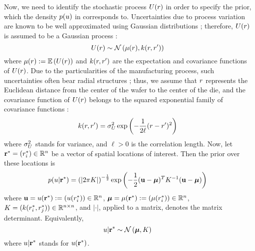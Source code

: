 Now, we need to identify the stochastic process $U(r)$ in order to specify the prior, which the density $\f{\u}$ in  corresponds to. Uncertainties due to process variation are known to be well approximated using Gaussian distributions \cite{srivastava2010}; therefore, $U(r)$ is assumed to be a Gaussian process \cite{rasmussen2006}:
\[
  \U(\r) \sim \gaussianp{\fMean{\r}}{\fCov{\r, \r'}}
\]
where $\fMean{\r} := \E{\U(\r)}$ and $\fCov{\r, \r'}$ are the expectation and covariance functions of $U(r)$. Due to the particularities of the manufacturing process, such uncertainties often bear radial structures \cite{cheng2011}; thus, we assume that $r$ represents the Euclidean distance from the center of the wafer to the center of the die, and the covariance function of $U(r)$ belongs to the squared exponential family of covariance functions \cite{rasmussen2006}:
\begin{equation} \elabel{covariance-function}
  \fCov{\r, \r'} = \sigma^2_\U \exp\left(-\frac{1}{2 \ell}(\r - \r')^2\right)
\end{equation}
where $\sigma^2_U$ stands for variance, and $\ell > 0$ is the correlation length. Now, let $\mathbf{r}^* = (r^*_i) \in \mathbb{R}^n$ be a vector of spatial locations of interest. Then the prior over these locations is
\begin{equation} \elabel{prior}
  \f{\u | \vr^*} = \left(|2 \pi \mCov|\right)^{-\frac{1}{2}} \exp\left(-\frac{1}{2} (\vu - \vfMean)^T \mCov^{-1} (\vu - \vfMean) \right)
\end{equation}
where $\mathbf{u} = u(\mathbf{r}^*) := (u(r^*_i)) \in \mathbb{R}^n$, $\vfMean = \fMean{\vr^*} := (\fMean{\r^*_i}) \in \real^n$, $\mCov = (\fCov{\r^*_i, \r^*_j}) \in \real^{n \times n}$, and $|\cdot|$, applied to a matrix, denotes the matrix determinant. Equivalently,
\[
  u | \mathbf{r}^* \sim \mathcal{N}\left(\boldsymbol\mu, K\right)
\]
where $u | \mathbf{r}^*$ stands for $u(\mathbf{r}^*)$.

